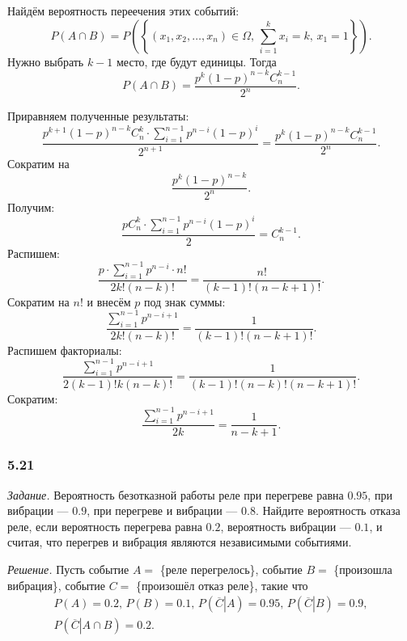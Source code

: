 Найдём вероятность переечения этих событий:
$$P \left( A \cap B \right) =
P \left( \left\{ \left( x_1, x_2, \dotsc, x_n \right) \in \Omega, \, \sum \limits_{i=1}^k x_i = k, \, x_1 = 1 \right\} \right).$$
Нужно выбрать $k - 1$ место, где будут единицы.
Тогда
$$P \left( A \cap B \right) =
\frac{p^k \left( 1-p \right)^{n-k} C_n^{k-1}}{2^n}.$$

Приравняем полученные результаты:
$$ \frac{p^{k+1} \left( 1-p \right)^{n-k} C_n^k \cdot \sum \limits_{i=1}^{n-1} p^{n-i} \left( 1-p \right)^i}{2^{n+1}} =
\frac{p^k \left( 1-p \right)^{n-k} C_n^{k-1}}{2^n}.$$
Сократим на
$$\frac{p^k \left( 1-p \right)^{n-k}}{2^n}.$$
Получим:
$$ \frac{p C_n^k \cdot \sum \limits_{i=1}^{n-1} p^{n-i} \left( 1-p \right)^i}{2} =
C_n^{k-1}.$$
Распишем:
$$ \frac{p \cdot \sum \limits_{i=1}^{n-1} p^{n-i} \cdot n!}{2k! \left( n-k \right)!} =
\frac{n!}{ \left( k-1 \right)! \left( n-k+1 \right)!}.$$
Сократим на $n!$ и внесём $p$ под знак суммы:
$$\frac{\sum \limits_{i=1}^{n-1} p^{n-i+1}}{2k! \left( n-k \right)!} = \frac{1}{ \left( k-1 \right)! \left( n-k+1 \right)!}.$$
Распишем факториалы:
$$\frac{\sum \limits_{i=1}^{n-1} p^{n-i+1}}{2 \left( k-1 \right)!k \left( n-k \right)!} = \frac{1}{ \left( k-1 \right)! \left( n-k \right)! \left(n-k+1 \right)!}.$$
Сократим:
$$\frac{\sum \limits_{i=1}^{n-1} p^{n-i+1}}{2k} = \frac{1}{n-k+1}.$$

\subsubsection*{5.21}

\textit{Задание.} Вероятность безотказной работы реле при перегреве равна $0.95$, при вибрации --- $0.9$, при перегреве и вибрации --- $0.8$.
Найдите вероятность отказа реле, если вероятность перегрева равна $0.2$, вероятность вибрации --- $0.1$, и считая, что перегрев и вибрация являются независимыми событиями.

\textit{Решение.}
Пусть событие $A =$ \{реле перегрелось\}, событие $B =$ \{произошла вибрация\}, событие $C =$ \{произошёл отказ реле\}, такие что
\begin{equation*}
\begin{split}
P \left( A \right) = 0.2, \,
P \left( B \right) = 0.1, \,
P \left( \left. \overline{C} \right| A \right) = 0.95, \,
P \left( \left. \overline{C} \right| B \right) = 0.9, \\
P \left( \left. \overline{C} \right| A \cap B \right) = 0.2.
\end{split}
\end{equation*}

